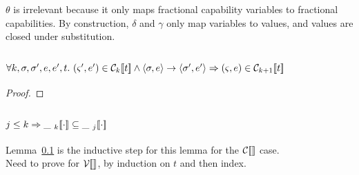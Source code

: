 $\theta$ is irrelevant because it only maps fractional capability variables to
fractional capabilities. By construction, $\delta$ and $\gamma$ only map
variables to values, and values are closed under substitution.

\subsection{$
    \forall k, \sigma, \sigma', e, e', t.  \ (\varsigma', e') \in \mathcal{C}_{k} [\![ t ]\!] \wedge
    \langle \sigma, e \rangle \rightarrow \langle \sigma', e' \rangle
    \Rightarrow (\varsigma, e) \in \mathcal{C}_{k+1} [\![ t ]\!]
$}\label{stepInC}

\begin{proof}




\end{proof}

\subsection{$j \leq k \Rightarrow \mathcal{\_\ }_{k} [\![ \cdot ]\!] \subseteq \mathcal{\_\ }_{j} [\![ \cdot ]\!]$}\label{subsetKJ}

Lemma~\ref{stepInC} is the inductive step for this lemma for the $\mathcal{C}_{} [\![  ]\!]$ case.\\
Need to prove for $\mathcal{V}_{} [\![  ]\!]$, by induction on $t$ and then index.

